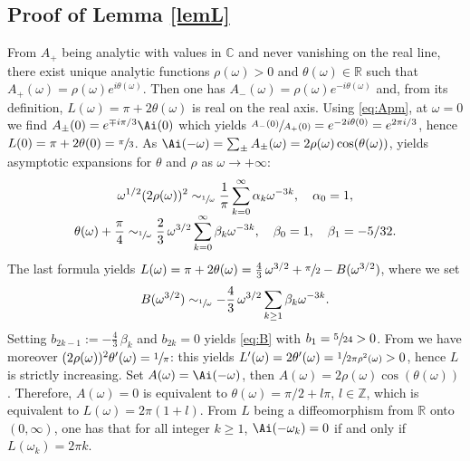 \subsection{Proof of Lemma \ref{lemL}}
From $A_+$ being analytic with values in $\mathbb{C}$ and never vanishing on the real line, there exist unique analytic functions $\rho(\omega)>0$ and $\theta(\omega)\!\in\!\mathbb{R}$
such that $A_+(\omega)=\rho(\omega)e^{i\theta(\omega)}$. Then one has $A_-(\omega)=\rho(\omega)e^{-i\theta(\omega)}$ and, from its definition, $L(\omega)=\pi+2\theta(\omega)$ is real on the real axis.
Using \eqref{eq:Apm}, at $\omega=0$ we find $A_{\pm}(0)=e^{\mp i\pi/3}\Ai(0)$ which yields $\sfrac{A_-(0)}{A_+(0)}=e^{-2i\theta(0)}=e^{2\pi i/3}$, hence $L(0)=\pi+2\theta(0)=\sfrac{\pi}{3}$. As $\Ai(-\omega)=\sum_{\pm}A_{\pm}(\omega)=2\rho(\omega) \cos(\theta(\omega))$, \cite[(2.87), (2.104), (2.106)]{AFbook} yields asymptotic expansions for $\theta$ and $\rho$ as $\omega\to +\infty$:\vspace*{-3pt}\enlargethispage{\baselineskip}%
\begin{gather*}
\omega^{1/2}(2\rho(\omega))^2\sim_{\sfrac 1\omega} \frac{1}{\pi}\sum_{k=0}^{\infty}\alpha_k \omega^{-3k}, \quad \alpha_0=1,\\[
-5pt]
\theta(\omega)+\frac{\pi}{4}\sim_{\sfrac 1\omega} \frac 23\, \omega^{3/2}\sum_{k=0}^{\infty}\beta_k\omega^{-3k},\quad \beta_0=1,\quad \beta_1=-5/32.
\end{gather*}
The last formula yields $L(\omega)=\pi+2\theta(\omega)=\frac 43\, \omega^{3/2}+\sfrac{\pi}{2}-B(\omega^{3/2})$, where we set\vspace*{-5pt}
\[
B(\omega^{3/2})\sim_{\sfrac 1\omega}-\frac 43\,\omega^{3/2}\sum_{k\geq 1}\beta_k \omega^{-3k}.
\]
\Changel
Setting $b_{2k-1}:=-\frac 43\,\beta_k$ and $b_{2k}=0$ yields \eqref{eq:B} with $b_1=\sfrac{5}{24}>0$. From \cite[(2.95)]{AFbook} we have moreover $(2\rho(\omega))^2\theta'(\omega)=\sfrac{1}{\pi}$: this yields $L'(\omega)=2\theta'(\omega)=\sfrac{1}{2\pi\rho^2(\omega)}>0$,
hence $L$ is strictly increasing. Set $A(\omega)=\Ai(-\omega)$, then $A(\omega)=2\rho(\omega)\cos(\theta(\omega))$. Therefore, $A(\omega)=0$ is equivalent to $\theta(\omega)=\pi/2+l\pi$, $l\in \mathbb{Z}$, which is equivalent to $L(\omega)=2\pi(1+l)$. From $L$ being a diffeomorphism from $\mathbb{R}$ onto $(0,\infty)$, one has that for all integer $k\geq 1$, $\Ai(-\omega_k)=0$ if and only if $L(\omega_k)=2\pi k$.
\Changelback

